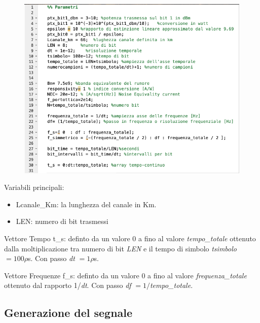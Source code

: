 \documentclass[12pt, a4paper]{article}
\begin{document}
\begin{figure}[h!]
\centering
\includegraphics[scale=1.0]{parametri.png}
\caption{}
\label{}
\end{figure}

Variabili principali:
\begin{itemize}
	\item Lcanale\_Km: la lunghezza del canale in Km. 
	\item LEN: numero di bit trasmessi
\end{itemize}

Vettore Tempo t\_s: definto da un valore 0 a fino al valore \textit{tempo\_totale} ottenuto dalla moltiplicazione tra numero di bit \textit{LEN} e il tempo di simbolo \textit{tsimbolo} $= 100 \rho$s. Con passo \textit{dt} $= 1 \rho$s.

\vspace{5mm}
Vettore Frequenze f\_s: definto da un valore 0 a fino al valore \textit{frequenza\_totale} ottenuto dal rapporto 1/\textit{dt}.  Con passo \textit{df} $= 1/$\textit{tempo\_totale}.


\newpage
\subsection{Generazione del segnale}
\label{sub:2.2}
\end{document}
